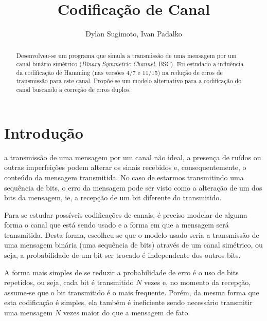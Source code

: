 \documentclass[journal,comsoc]{IEEEtran}
\begin{document}
	
	\title{Codificação de Canal}
	
	\author{Dylan Sugimoto, Ivan Padalko}
	
	
	\maketitle
	
	\begin{abstract}
		Desenvolveu-se um programa que simula a transmissão de uma mensagem por um canal binário simétrico (\emph{Binary Symmetric Channel}, BSC). Foi estudado a influência da codificação de Hamming (nas versões 4/7 e 11/15) na redução de erros de transmissão para este canal. Propõe-se um modelo alternativo para a codificação do canal buscando a correção de erros duplos.
	\end{abstract}
	
	\section{Introdução}
	
		 a transmissão de uma mensagem por um canal não ideal, a presença de ruídos ou outras imperfeições podem alterar os sinais recebidos e, consequentemente, o conteúdo da mensagem transmitida. No caso de estarmos transmitindo uma sequência de bits, o erro da mensagem pode ser visto como a alteração de um dos bits da mensagem, ie, a recepção de um bit diferente do transmitido.
	
		Para se estudar possíveis codificações de canais, é preciso modelar de alguma forma o canal que está sendo usado e a forma em que a mensagem será transmitida. Desta forma, escolheu-se que o modelo usado seria a transmissão de uma mensagem binária (uma sequência de bits) através de um canal simétrico, ou seja, a probabilidade de um bit ser trocado é independente dos outros bits.
		
		A forma mais simples de se reduzir a probabilidade de erro é o uso de bits repetidos, ou seja, cada bit é transmitido $N$ vezes e, no momento da recepção, assume-se que o bit transmitido é o mais frequente. Porém, da mesma forma que esta codificação é simples, ela também é ineficiente sendo necessário transmitir uma mensagem $N$ vezes maior do que a mensagem de fato. 
		
\end{document}
